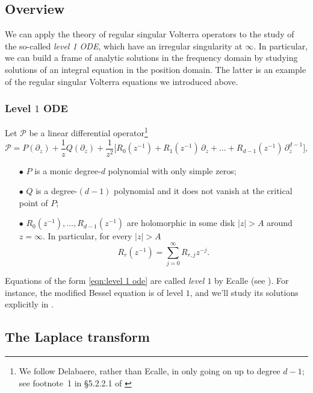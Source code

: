 \documentclass{article}
\theoremstyle{plain}
\begin{document}
\subsection{Overview}

We can apply the theory of regular singular Volterra operators to the study of the so-called \textit{level 1 ODE}, which have an irregular singularity at $\infty$. In particular, we can build a frame of analytic solutions in the frequency domain by studying solutions of an integral equation in the position domain. The latter is an example of the regular singular Volterra equations we introduced above.    

\subsubsection{Level $1$ ODE}\label{sec:level 1 ODE}

Let $\mathcal{P}$ be a linear differential operator\footnote{ We follow Delabaere, rather than Ecalle, in only going on up to degree $d-1$; see footnote~1 in \S 5.2.2.1 of \cite{diverg-resurg-iii}}
\begin{equation}\label{eqn:level 1 ode}
\mathcal{P} = P(\partial_z) + \frac{1}{z} Q(\partial_z) + \frac{1}{z^2}\big[ R_0(z^{-1}) + R_1(z^{-1})\,\partial_z + \ldots + R_{d-1}(z^{-1})\,\partial_z^{d-1} \big],
\end{equation}

\begin{enumerate}
\item[$\bullet$] $P$ is a monic degree-$d$ polynomial with only simple zeros; 
\item[$\bullet$] $Q$ is a degree-$(d-1)$ polynomial and it does not vanish at the critical point of $P$;
\item[$\bullet$] $R_0(z^{-1}), \ldots, R_{d-1}(z^{-1})$ are holomorphic in some disk $|z| > A$ around $z = \infty$. In particular, for every $|z|>A$
\[ R_r(z^{-1}) = \sum_{j=0}^\infty R_{r,j} z^{-j}. \]
\end{enumerate}

Equations of the form \eqref{eqn:level 1 ode} are called {\em level $1$} by Ecalle (see \cite[Section 2.1]{EcalleIII}). For instance, the modified Bessel equation is of level $1$, and we'll study its solutions explicitly in \cite{borel_reg}. 

\subsection{The Laplace transform}
\end{document}
